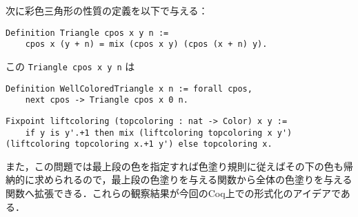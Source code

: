 次に彩色三角形の性質の定義を以下で与える：
\begin{lstlisting}[language=Coq]
  Definition Triangle cpos x y n :=
    cpos x (y + n) = mix (cpos x y) (cpos (x + n) y).
\end{lstlisting}
この {\tt Triangle cpos x y n} は


\begin{lstlisting}[language=Coq]
  Definition WellColoredTriangle x n := forall cpos,
    next cpos -> Triangle cpos x 0 n.
\end{lstlisting}

\begin{lstlisting}[language=Coq]
  Fixpoint liftcoloring (topcoloring : nat -> Color) x y :=
    if y is y'.+1 then mix (liftcoloring topcoloring x y') (liftcoloring topcoloring x.+1 y') else topcoloring x.
\end{lstlisting}


また，この問題では最上段の色を指定すれば色塗り規則に従えばその下の色も帰納的に求められるので，最上段の色塗りを与える関数から全体の色塗りを与える関数へ拡張できる．これらの観察結果が今回のCoq上での形式化のアイデアである．

